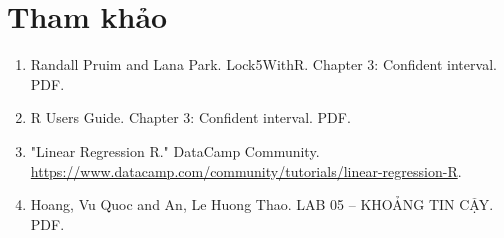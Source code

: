 \documentclass[a4paper,12pt]{article}
\begin{document}
	\section{Tham khảo}
		\label{Tham khao}
		\begin{enumerate}[label=$\lbrack$\arabic*$\rbrack$]
			\item Randall Pruim and Lana Park. Lock5WithR. Chapter 3: Confident interval. PDF. 
			\item R Users Guide. Chapter 3: Confident interval. PDF.
			\item "Linear Regression R." DataCamp Community. \url{https://www.datacamp.com/community/tutorials/linear-regression-R}.
			\item Hoang, Vu Quoc and An, Le Huong Thao. LAB 05 – KHOẢNG TIN CẬY. PDF.
		\end{enumerate}
		 
	
\end{document}
